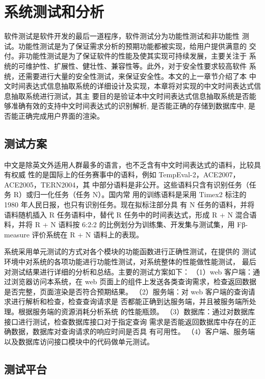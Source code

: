 
\chapter{系统测试和分析}

软件测试是软件开发的最后一道程序，软件测试分为功能性测试和非功能性
测试。功能性测试是为了保证需求分析的预期功能都被实现，给用户提供满意的
交付。非功能性测试是为了保证软件的性能及使其实现可持续发展，主要关注于
系统的可维护性、扩展性、健壮性、兼容性等。此外，对于安全性要求较高软件
系统，还需要进行大量的安全性测试，来保证安全性。本文的上一章节介绍了本
中文时间表达式信息抽取系统的详细设计及实现，本章将对实现的中文时间表达式信息抽取系统进行测试，其主
要目的是验证本中文时间表达式信息抽取系统是否能够准确有效的支持中文时间表达式的识别解析, 是否能正确的存储到数据库中, 是否能正确完成用户界面的渲染。

\section{测试方案}

中文是除英文外适用人群最多的语言，也不乏含有中文时间表达式的语料，比较具有权威
性的是国际上的任务赛事中的语料，例如 TempEval-2，ACE2007，ACE2005，TERN2004，其
中部分语料是非公开。这些语料只含有识别任务（任务 R）或归一化任务（任务 N）。国内常
用的训练语料是采用 Timex2 标注的 1980 年人民日报，也只有识别任务。现在拟标注部分具
有 N 任务的语料，并将语料随机插入 R 任务语料中，替代 R 任务中的时间表达式，形成 R +
N 混合语料，并将 R + N 语料按 6:2:2 的比例划分为训练集、开发集与测试集，用 Fβ-measure
评价系统在 R + N 语料上的表现。

系统采用单元测试的方式对各个模块的功能函数进行正确性测试，在提供的
测试环境中对系统的各项功能进行功能性测试，对系统整体的性能做性能测试，
最后对测试结果进行详细的分析和总结。主要的测试方案如下：
（1）web 客户端：通过浏览器访问本系统，在 web 页面上的组件上发送各类查询需求，检查返回数据是否完整，页面渲染是否符合预期结果。
（2）服务端：对 web 客户端的查询请求进行解析和检查，检查查询请求是
否都能正确到达服务端，并且被服务端所处理。根据服务端的资源消耗分析系统
的性能瓶颈。
（3）数据库：通过对数据库接口进行测试，检查数据库接口对于指定查询
需求是否能返回数据库中存在的正确数据，数据库对查询请求的响应时间是否具
有可用性。
（4）客户端、服务端以及数据库访问接口模块中的代码做单元测试。

\section{测试平台}



